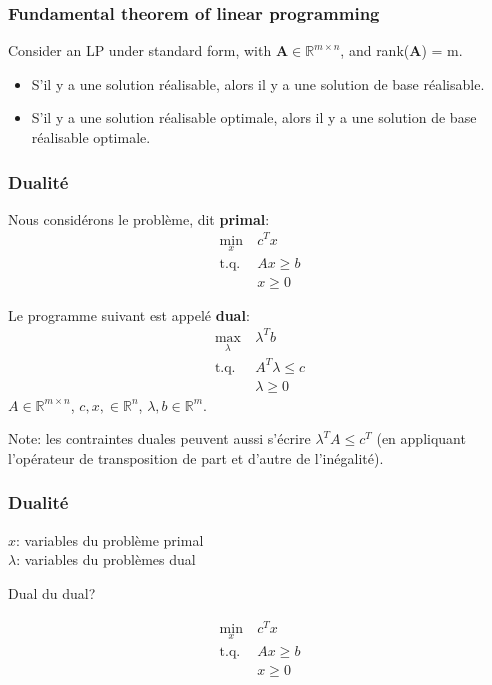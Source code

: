 \documentclass{beamer}
\def\RR{\mathcal{R}}
\def\bA{\boldsymbol{A}}
\def\RR{\mathbb{R}}
\begin{document}
\begin{frame}
	\frametitle{Fundamental theorem of linear programming}

Consider an LP under standard form, with $\bA \in \RR^{m \times n}$, and rank($\bA$) = m.
	\begin{itemize}
		\item
		S'il y a une solution réalisable, alors il y a une solution de base réalisable.
		\item
		S'il y a une solution réalisable optimale, alors il y a une solution de base réalisable optimale.
	\end{itemize}

\end{frame}
\begin{frame}
	\frametitle{Dualité}
	
	Nous considérons le problème, dit {\bf primal}:
	\begin{align*}
		\min_x \ & c^T x \\
		\mbox{t.q. } & Ax \geq b \\
		& x \geq 0
	\end{align*}
	
	\mbox{}
	
	Le programme suivant est appelé {\bf dual}:
	\begin{align*}
		\max_{\lambda} \ & \lambda^T b \\
		\mbox{t.q. } & A^T \lambda \leq c \\
		& \lambda \geq 0
	\end{align*}
	$A \in \RR^{m \times n}$, $c, x, \in \RR^n$, $\lambda, b \in \RR^m$.
	
	Note: les contraintes duales peuvent aussi s'écrire $\lambda^T A \leq c^T$ (en appliquant l'opérateur de transposition de part et d'autre de l'inégalité).
	
\end{frame}

\begin{frame}
	\frametitle{Dualité}
	
	$x$: variables du problème primal\\
	$\lambda$: variables du problèmes dual
	
	\mbox{}
	
	Dual du dual?
	
	\mbox{}
	
	\begin{align*}
		\min_x \ & c^T x \\
		\mbox{t.q. } & Ax \geq b \\
		& x \geq 0
	\end{align*}
	
\end{frame}
\end{document}
